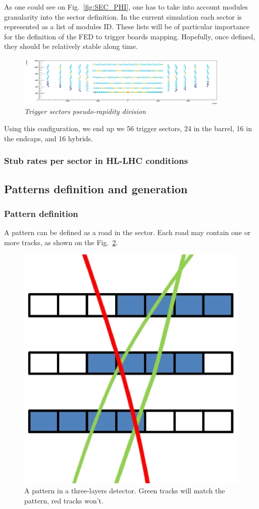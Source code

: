 \noindent As one could see on Fig.~\ref{fig:SEC_PHI}, one has to take into account modules granularity into the sector definition. In the current simulation each sector is represented as a list of modules ID. These lists will be of particular importance for the definition of the FED to trigger boards mapping. Hopefully, once defined, they should be relatively stable along time. 

\begin{figure}[ht!]
\centering
\includegraphics[width=0.9\textwidth]{Plots/EtaCut.eps}
\caption{\emph{Trigger sectors pseudo-rapidity division}}
\label{fig:SEC_ETA}
\end{figure} 

\noindent Using this configuration, we end up we 56 trigger sectors, 24 in the barrel, 16 in the endcaps, and 16 hybrids.

\subsubsection{Stub rates per sector in HL-LHC conditions}





\subsection{Patterns definition and generation}

\subsubsection{Pattern definition}

\noindent A pattern can be defined as a road in the sector. Each road may contain one or more tracks, as shown on the Fig.~\ref{fig:pattern}. 
\begin{figure}[ht!]
\centering
\includegraphics[width=0.3\columnwidth]{Plots/Pattern.eps}
\caption{A pattern in a three-layers detector. Green tracks will match the pattern, red tracks won't.}
\label{fig:pattern}
\end{figure}

